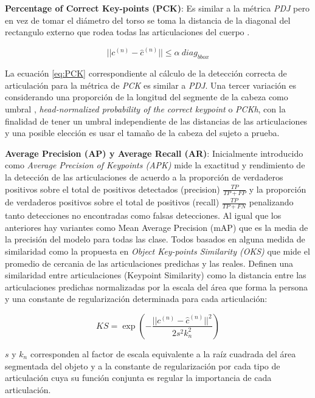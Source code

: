 \textbf{Percentage of Correct Key-points (PCK)}: Es similar a la métrica \textit{PDJ} pero en vez de
tomar el diámetro del torso se toma la distancia de la diagonal del rectangulo externo que rodea
todas las articulaciones del cuerpo \cite{6380498}.

\begin{equation}
    ||c^{(n)} - \hat{c}^{(n)}|| \le \alpha\ diag_{bbox}
    \label{eq:PCK}
\end{equation}

La ecuación \ref{eq:PCK} correspondiente al cálculo de la detección correcta de articulación para la
métrica de \textit{PCK} es similar a \textit{PDJ}. Una tercer variación es considerando una
proporción de la longitud del segmente de la cabeza como umbral \cite{6909866},
\textit{head-normalized probability of the correct keypoint} o \textit{PCKh}, con la finalidad
de tener un umbral independiente de las distancias de las articulaciones y una posible elección
es usar el tamaño de la cabeza del sujeto a prueba.

\textbf{Average Precision (AP) y Average Recall (AR)}: Inicialmente introducido
como  \textit{Average Precision of Keypoints (APK)} \cite{6380498} mide la exactitud y rendimiento
de la detección de las articulaciones de acuerdo a la proporción de verdaderos positivos sobre el
total de positivos detectados (precision) $\frac{TP}{TP + FP}$ y la proporción
de verdaderos positivos sobre el total de positivos (recall) $\frac{TP}{TP + FN}$ penalizando tanto
detecciones no encontradas como falsas detecciones. Al igual que los anteriores hay variantes
como Mean Average Precision (mAP) que es la media de la precisión del modelo para todas las
clase. Todos basados en alguna medida de similaridad como la propuesta en
\textit{Object Key-points Similarity (OKS)} que mide el promedio de cercania de las articulaciones
predichas y las reales. Definen una similaridad entre articulaciones (Keypoint Similarity)
\cite{DBLP:journals/corr/LinMBHPRDZ14}
como la distancia entre las articulaciones predichas normalizadas por la escala del
área que forma la persona y una constante de regularización determinada para cada articulación:

\begin{equation}
    KS = \exp(- \frac{||c^{(n)} - \hat{c}^{(n)}||^2}{2s^2 k^2_n})
    \label{eq:KS}
\end{equation}

$s$ y $k_n$ corresponden al factor de escala equivalente a la raíz cuadrada del área segmentada del
objeto y a la constante de regularización por cada tipo de articulación cuya su función conjunta
es regular la importancia de cada articulación.

